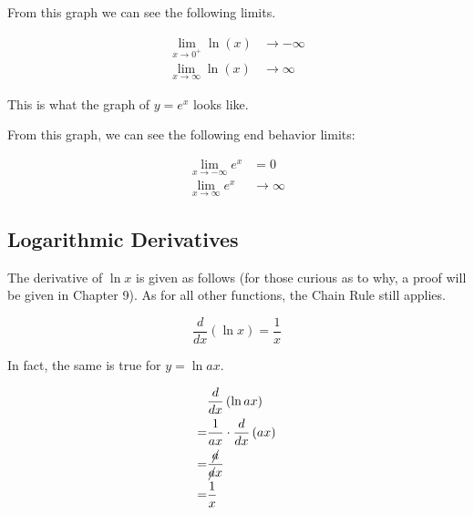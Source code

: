 From this graph we can see the following limits.

\begin{align*}
    \lim_{x \to 0^+} \ln{\left(x \right)} &\to -\infty \\
    \lim_{x \to \infty} \ln{\left( x \right)} &\to \infty
\end{align*}

\newpage

This is what the graph of \( y = e^x \) looks like.

\begin{center}
\end{center}

From this graph, we can see the following end behavior limits:

\begin{align*}
    \lim_{x \to -\infty} e^x &= 0 \\
    \lim_{x \to \infty} e^x &\to \infty
\end{align*}

\subsection{Logarithmic Derivatives}

The derivative of \( \ln{x} \) is given as follows (for those curious as to why, a proof will be given in Chapter 9). As for all other functions, the Chain Rule still applies.

\[ \dfrac{d}{dx} \left( \ln{x} \right) = \dfrac{1}{x} \]

In fact, the same is true for \( y = \ln{ax} \).

\begin{align}
    &\dfrac{d}{dx} \left( \ln{ax} \right) \\
    = &\dfrac{1}{ax} \cdot \dfrac{d}{dx} \left( ax \right) \\
    = &\dfrac{\cancel{a}}{\cancel{a}x} \\
    = &\dfrac{1}{x}
\end{align}


